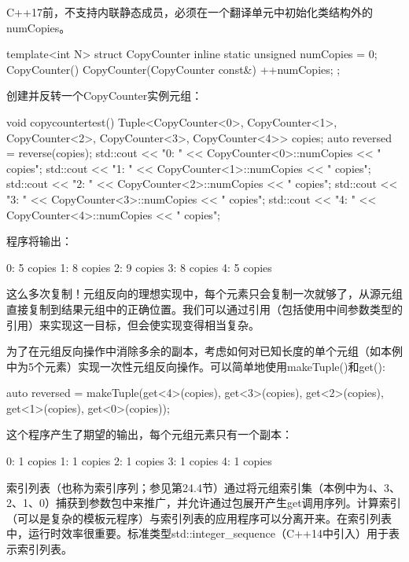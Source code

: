 \begin{notice}
C++17前，不支持内联静态成员，必须在一个翻译单元中初始化类结构外的numCopies。
\end{notice}

\begin{cpp}
template<int N>
struct CopyCounter
{
	inline static unsigned numCopies = 0;
	CopyCounter() {
	}
	CopyCounter(CopyCounter const&) {
		++numCopies;
	}
};
\end{cpp}

创建并反转一个CopyCounter实例元组：

\begin{cpp}
void copycountertest() {
	Tuple<CopyCounter<0>, CopyCounter<1>, CopyCounter<2>,
			CopyCounter<3>, CopyCounter<4>> copies;
	auto reversed = reverse(copies);
	std::cout << "0: " << CopyCounter<0>::numCopies << " copies\n";
	std::cout << "1: " << CopyCounter<1>::numCopies << " copies\n";
	std::cout << "2: " << CopyCounter<2>::numCopies << " copies\n";
	std::cout << "3: " << CopyCounter<3>::numCopies << " copies\n";
	std::cout << "4: " << CopyCounter<4>::numCopies << " copies\n";
}
\end{cpp}

程序将输出：

\begin{shell}
0: 5 copies
1: 8 copies
2: 9 copies
3: 8 copies
4: 5 copies
\end{shell}

这么多次复制！元组反向的理想实现中，每个元素只会复制一次就够了，从源元组直接复制到结果元组中的正确位置。我们可以通过引用（包括使用中间参数类型的引用）来实现这一目标，但会使实现变得相当复杂。

为了在元组反向操作中消除多余的副本，考虑如何对已知长度的单个元组（如本例中为5个元素）实现一次性元组反向操作。可以简单地使用makeTuple()和get():

\begin{cpp}
auto reversed = makeTuple(get<4>(copies), get<3>(copies),
							get<2>(copies), get<1>(copies),
							get<0>(copies));
\end{cpp}

这个程序产生了期望的输出，每个元组元素只有一个副本：

\begin{shell}
0: 1 copies
1: 1 copies
2: 1 copies
3: 1 copies
4: 1 copies
\end{shell}

索引列表（也称为索引序列；参见第24.4节）通过将元组索引集（本例中为4、3、2、1、0）捕获到参数包中来推广，并允许通过包展开产生get调用序列。计算索引（可以是复杂的模板元程序）与索引列表的应用程序可以分离开来。在索引列表中，运行时效率很重要。标准类型std::integer\_sequence（C++14中引入）用于表示索引列表。

